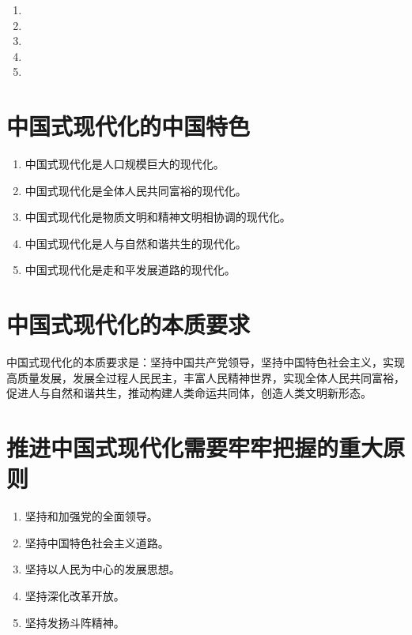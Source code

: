 \documentclass[12pt, a4paper, oneside]{ctexbook}
\begin{document}
\begin{enumerate}
\item 

\item 

\item 

\item 

\item 
\end{enumerate}

\section{中国式现代化的中国特色}

\begin{enumerate}
\item 中国式现代化是人口规模巨大的现代化。

\item 中国式现代化是全体人民共同富裕的现代化。

\item 中国式现代化是物质文明和精神文明相协调的现代化。

\item 中国式现代化是人与自然和谐共生的现代化。

\item 中国式现代化是走和平发展道路的现代化。
\end{enumerate}

\section{中国式现代化的本质要求}

中国式现代化的本质要求是：坚持中国共产党领导，坚持中国特色社会主义，实现高质量发展，发展全过程人民民主，丰富人民精神世界，实现全体人民共同富裕，促进人与自然和谐共生，推动构建人类命运共同体，创造人类文明新形态。

\section{推进中国式现代化需要牢牢把握的重大原则}

\begin{enumerate}
\item 坚持和加强党的全面领导。

\item 坚持中国特色社会主义道路。

\item 坚持以人民为中心的发展思想。

\item 坚持深化改革开放。

\item 坚持发扬斗阵精神。
\end{enumerate}
\end{document}
